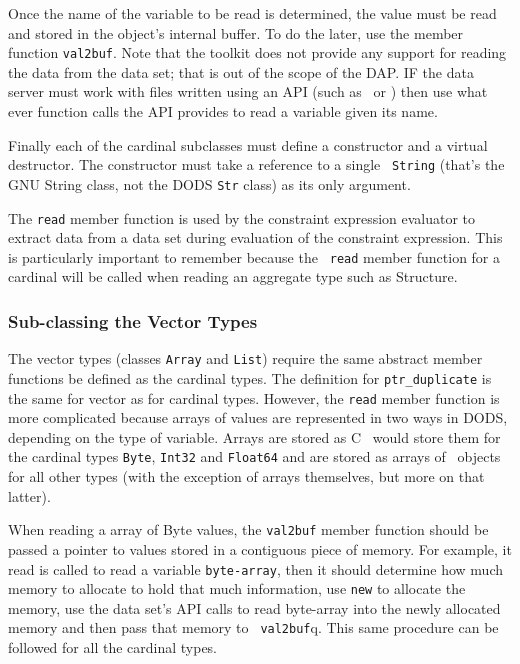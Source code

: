 Once the name of the variable to be read is determined, the value must be
read and stored in the object's internal buffer. To do the later, use the
member function {\tt val2buf}. Note that the toolkit does not provide any
support for reading the data from the data set; that is out of the scope of
the DAP. IF the data server must work with files written using an API (such
as \netcdf\ or \hdf) then use what ever function calls the API provides
to read a variable given its name.

Finally each of the cardinal subclasses must define a constructor and a
virtual destructor. The constructor must take a reference to a single {\tt
  String} (that's the GNU String class, not the DODS {\tt Str} class) as its
only argument.

The {\tt read} member function is used by the constraint expression evaluator
to extract data from a data set during evaluation of the constraint
expression.  This is particularly important to remember because the {\tt
  read} member function for a cardinal will be called when reading an
aggregate type such as Structure.

\subsubsection{Sub-classing the Vector Types}

The vector types (classes {\tt Array} and {\tt List}) require the same
abstract member functions be defined as the cardinal types. The definition
for {\tt ptr\_duplicate} is the same for vector as for cardinal types.
However, the {\tt read} member function is more complicated because arrays of
values are represented in two ways in DODS, depending on the type of
variable. Arrays are stored as C~\cite{kr:c} would store them for the
cardinal types {\tt Byte}, {\tt Int32} and {\tt Float64} and are stored as
arrays of \Cpp\ objects for all other types (with the exception of arrays
themselves, but more on that latter).

When reading a array of Byte values, the {\tt val2buf} member function should
be passed a pointer to values stored in a contiguous piece of memory. For
example, it read is called to read a variable {\tt byte-array}, then it
should determine how much memory to allocate to hold that much information,
use {\tt new} to allocate the memory, use the data set's API calls to read
byte-array into the newly allocated memory and then pass that memory to {\tt
  val2buf}q. This same procedure can be followed for all the cardinal types.

